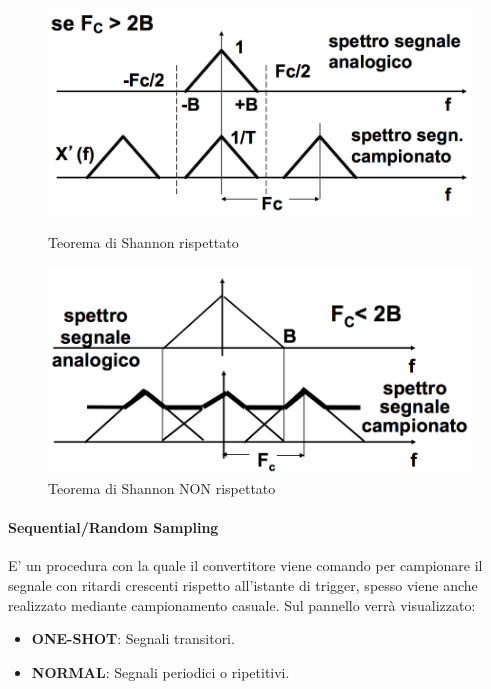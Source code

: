 \documentclass[12pt]{article}
\begin{document}
\begin{figure}[!hpt]
  \includegraphics[width=\textwidth]{images/si_fc.png}
  \caption{Teorema di Shannon rispettato}
  \label{fig:si_fc}
  \includegraphics[width=\textwidth]{images/no_fc.png}
  \caption{Teorema di Shannon NON rispettato}
  \label{fig:no_fc}
\end{figure}

\paragraph{Sequential/Random Sampling} E' un procedura con la quale il convertitore viene comando per campionare il segnale con ritardi crescenti rispetto all'istante di trigger, spesso viene anche realizzato mediante campionamento casuale. Sul pannello verrà visualizzato:
\begin{itemize}
  \item \textbf{ONE-SHOT}: Segnali transitori.
  \item \textbf{NORMAL}: Segnali periodici o ripetitivi.
\end{itemize}
\end{document}
